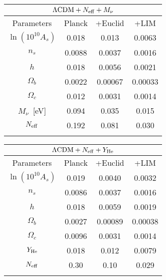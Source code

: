 \documentclass[twocolumn]{aastex631}
\renewcommand{\arraystretch}{1.6}
\begin{document}
\begin{table*}[t]
\begin{center}
\begin{minipage}[t]{0.45\textwidth}
\centering
\renewcommand{\arraystretch}{1.2}
\begin{tabularx}{.85\textwidth}{*{4}{C}} 
\vspace{.04in} \\ 
\hline  
Parameters &  Planck & +Euclid & +LIM \vspace{.04in} \\ 
\hline 
{\boldmath$\ln (10^{10}A_s)$}& 0.018 &  0.013 & 0.0063\\
{\boldmath$n_s$}& 0.0088 & 0.0037 & 0.0016 \\
{\boldmath$h$}& 0.018 & 0.0056 & 0.0021 \\
{\boldmath$\Omega_b$}& 0.0022 & 0.00067 & 0.00033\\
{\boldmath$\Omega_c$}& 0.012 & 0.0031 & 0.0014 \\
{\boldmath$M_\nu$}\ [eV] & 0.094 & 0.035 & 0.015 \\
{\boldmath$N_{\rm eff}$}& 0.192 & 0.081 & 0.030\\ \\
\end{tabularx} 
\end{minipage}
\begin{minipage}[t]{0.45\textwidth}
\centering
\renewcommand{\arraystretch}{1.2}
\begin{tabularx}{.85\textwidth}{*{4}{C}} 
 \vspace{.04in} \\ 
\hline 
Parameters &  Planck & +Euclid & +LIM \vspace{.04in} \\ 
\hline 
{\boldmath$\ln (10^{10}A_s)$}& 0.019 & 0.0040 & 0.0032\\
{\boldmath$n_s$}& 0.0086 & 0.0037 & 0.0016  \\
{\boldmath$h$}& 0.018 &  0.0059 &  0.0019 \\
{\boldmath$\Omega_b$}& 0.0027 & 0.00089 & 0.00038 \\
{\boldmath$\Omega_c$}& 0.0096 & 0.0031 &  0.0014 \\
{\boldmath$Y_{\rm He}$} & 0.018 & 0.012 & 0.0079\\
{\boldmath$N_{\rm eff}$} & 0.30 & 0.10 &  0.029\\ \\
\end{tabularx}
\end{minipage}
\vspace{.1in}


\end{center}
\end{table*}
\end{document}
